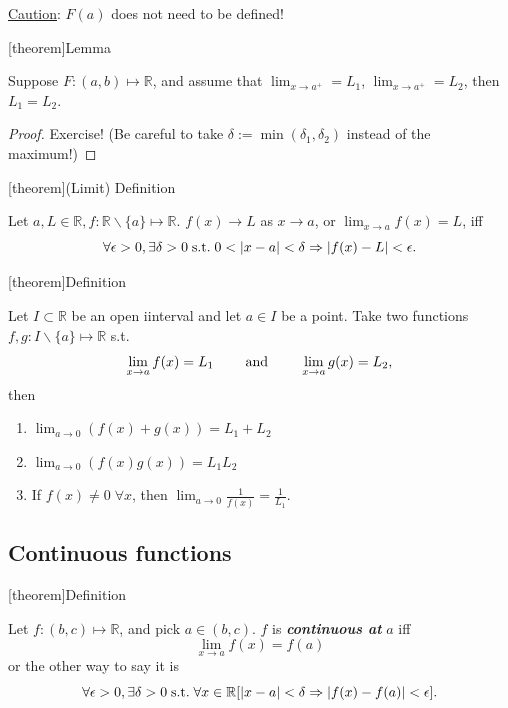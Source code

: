 \documentclass[12pt]{report}
\theoremstyle{definition}
\begin{document}
\underline{Caution}: $F(a)$ does not need to be defined!

[theorem]{Lemma}
\begin{left and right limit are equal}
    Suppose $F:(a,b) \mapsto \mathbb{R}$, and assume that $\lim_{x \rightarrow{}a^{+}} = L_1$,
    $\lim_{x \rightarrow{}a^{+}} = L_2$, then $L_1 = L_2$.
\end{left and right limit are equal}

\begin{proof}
    Exercise! (Be careful to take $\delta := \min{(\delta_1, \delta_2)}$
    instead of the maximum!)
\end{proof}

[theorem]{(Limit) Definition}
\begin{limit definition}
    Let $a,L \in\mathbb{R}, f:\mathbb{R}\backslash\{a\}\mapsto\mathbb{R}$.
    $f(x)\rightarrow{}L$ as $x\rightarrow{}a$,
    or $\lim_{x\rightarrow{}a}f(x) = L$, iff\[
        \forall \epsilon>0, \exists \delta>0 \;\textnormal{s.t.}\;
        0<|x-a|<\delta \Rightarrow{}|f(x)-L|<\epsilon.
    \]
\end{limit definition}

[theorem]{Definition}
\begin{Algebra of limits}
    Let $I\subset \mathbb{R}$ be an open iinterval and let $a\in I$ be a point.
    Take two functions $f,g:I\backslash\{a\}\mapsto\mathbb{R}$ s.t.\[
        \lim_{x\rightarrow{}a} f(x) = L_1 \qquad\;\textnormal{and}\;\qquad
        \lim_{x\to a} g(x) = L_2,
    \]then
    \begin{enumerate}
        \item $\lim_{a\to 0}(f(x)+g(x)) = L_1 + L_2$
        \item $\lim_{a\rightarrow{}0}(f(x)g(x)) = L_1L_2$
        \item If $f(x)\neq 0 \;\forall x$, then $\lim_{a\to{}0}\frac{1}{f(x)}=\frac{1}{L_1}$.
    \end{enumerate}
\end{Algebra of limits}

\subsection{Continuous functions}

[theorem]{Definition}
\begin{continuous at a}
    Let $f:(b,c)\mapsto\mathbb{R}$, and pick $a\in(b,c)$.
    $f$ is \textbf{\emph{continuous at}} $a$ iff\[
        \lim_{x\rightarrow{}a}f(x) = f(a)
    \]or the other way to say it is\[
        \forall \epsilon>0, \exists \delta>0 \;\textnormal{s.t.}\;
        \forall x\in\mathbb{R}[|x-a|<\delta \Rightarrow{}|f(x) - f(a)|<\epsilon].
    \]
\end{continuous at a}
\end{document}
